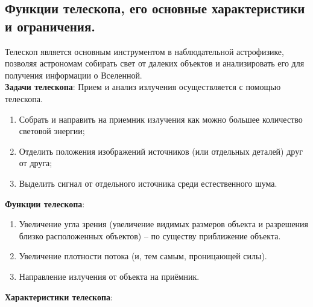 \documentclass[12pt]{article}
\begin{document}
	\subsection{Функции телескопа, его основные характеристики и ограничения.}
	Телескоп является основным инструментом в наблюдательной астрофизике, позволяя астрономам собирать свет от далеких объектов и анализировать его для получения информации о Вселенной.\\
		\textbf{Задачи телескопа}: Прием и анализ излучения
		осуществляется с помощью
		телескопа.
	\begin{enumerate}
		\item Собрать и направить на приемник излучения как
		можно большее количество световой энергии;
		\item Отделить положения изображений источников (или
		отдельных деталей) друг от друга;
		\item Выделить сигнал от отдельного источника среди
		естественного шума.
	\end{enumerate}
	\textbf{Функции телескопа}:
	\begin{enumerate}
		\item Увеличение угла зрения (увеличение видимых размеров объекта и разрешения близко расположенных объектов) – по существу приближение объекта.
		\item Увеличение плотности потока (и, тем самым, проницающей силы).
		\item Направление излучения от объекта на приёмник.
	\end{enumerate}
	\textbf{Характеристики телескопа}:
\end{document}
